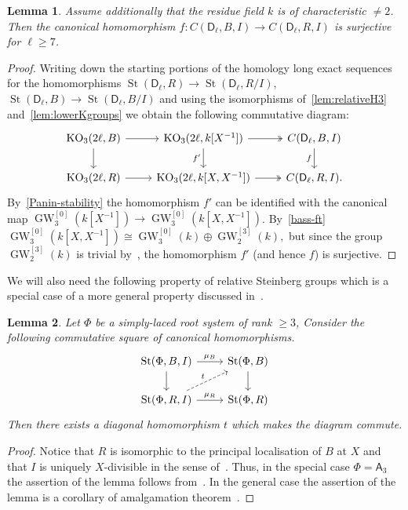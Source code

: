 \documentclass[oneside, 8pt]{amsart}
\newtheorem{lemma}{Lemma}
\theoremstyle{remark}
\theoremstyle{definition}
\numberwithin{lemma}{section}
\numberwithin{prop}{section}
\numberwithin{corollary}{section}
\numberwithin{externaltheorem}{section}
\DeclareMathOperator{\St}{St}
\DeclareMathOperator{\KO}{KO}
\DeclareMathOperator{\GW}{GW}
\newcommand{\rA}{\mathsf{A}}
\newcommand{\rD}{\mathsf{D}}
\numberwithin{equation}{section}
\begin{document}
\begin{lemma} \label{lem:prop41}
Assume additionally that the residue field $k$ is of characteristic $\neq 2$.
Then the canonical homomorphism $f\colon C(\rD_\ell, B, I) \to C(\rD_\ell, R, I)$ is surjective for $\ell \geq 7$. \end{lemma}
\begin{proof}
Writing down the starting portions of the homology long exact sequences for the homomorphisms $\St(\rD_\ell, R) \to \St(\rD_\ell, R/I)$, $\St(\rD_\ell, B) \to \St(\rD_\ell, B/I)$ and using the isomorphisms of~\cref{lem:relativeH3} and~\cref{lem:lowerKgroups} we obtain the following commutative diagram:
\[\begin{tikzcd} \KO_3(2\ell, B) \arrow{r} \arrow{d} & \KO_3(2\ell, k[X^{-1}]) \arrow{d}[swap]{f'} \ar[r, twoheadrightarrow] & \ar{d}[swap]{f} C(\rD_\ell, B, I) \\
 \KO_3(2\ell, R) \arrow{r} & \KO_3(2\ell, k[X, X^{-1}]) \ar[r, twoheadrightarrow] & C(\rD_\ell, R, I). \end{tikzcd} \]
By~\cref{Panin-stability} the homomorphism $f'$ can be identified with the canonical map $\GW_3^{[0]}(k[X^{-1}]) \to \GW_3^{[0]}(k[X, X^{-1}])$.
By~\cref{bass-ft} $\GW_3^{[0]}(k[X, X^{-1}]) \cong \GW_3^{[0]}(k) \oplus \GW_2^{[3]}(k),$
but since the group $\GW_2^{[3]}(k)$ is trivial by~\cite[Lemma~2.2]{FRS12}, the homomorphism $f'$ (and hence $f$) is surjective.
\end{proof} 
 
We will also need the following property of relative Steinberg groups which is a special case of a more general property discussed in~\cite[\S~2]{LS17}.
\begin{lemma}\label{lem:lemma32} Let $\Phi$ be a simply-laced root system of rank $\geq 3$,
Consider the following commutative square of canonical homomorphisms.
\[\begin{tikzcd} \St(\Phi, B, I) \arrow{r}{\mu_B} \arrow{d} & \St(\Phi, B) \arrow{d} \\ \St(\Phi, R, I) \arrow{r}{\mu_R} \ar[ur, "t", dashrightarrow] & \St(\Phi, R) \end{tikzcd} \]
Then there exists a diagonal homomorphism $t$ which makes the diagram commute.   
\end{lemma} 
\begin{proof}
 Notice that $R$ is isomorphic to the principal localisation of $B$ at $X$
  and that $I$ is uniquely $X$-divisible in the sense of~\cite[\S~4]{LS17}.
 Thus, in the special case $\Phi = \rA_3$ the assertion of the lemma follows from~\cite[Theorem~3]{LS17}.
 In the general case the assertion of the lemma is a corollary of amalgamation theorem~\cite[Theorem~9]{S15}.
\end{proof}
\end{document}
